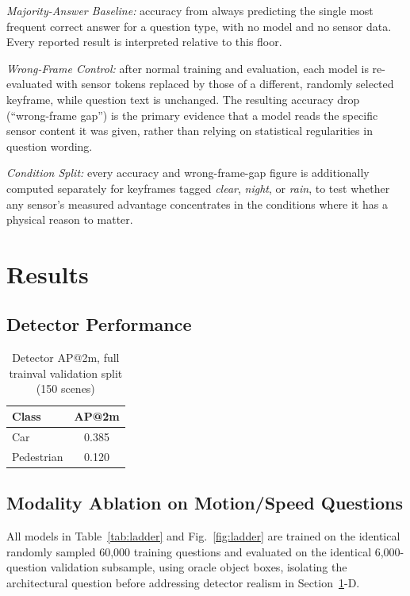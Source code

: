 \documentclass[conference]{IEEEtran}
\begin{document}
\emph{Majority-Answer Baseline:} accuracy from always predicting the single most frequent correct answer for a
question type, with no model and no sensor data. Every reported result is interpreted relative to this floor.

\emph{Wrong-Frame Control:} after normal training and evaluation, each model is re-evaluated with sensor tokens
replaced by those of a different, randomly selected keyframe, while question text is unchanged. The resulting
accuracy drop (``wrong-frame gap'') is the primary evidence that a model reads the specific sensor content it was
given, rather than relying on statistical regularities in question wording.

\emph{Condition Split:} every accuracy and wrong-frame-gap figure is additionally computed separately for
keyframes tagged \emph{clear}, \emph{night}, or \emph{rain}, to test whether any sensor's measured advantage
concentrates in the conditions where it has a physical reason to matter.

\section{Results}
\label{sec:results}

\subsection{Detector Performance}
\begin{table}[htbp]
\centering
\caption{Detector AP@2m, full trainval validation split (150 scenes)}
\label{tab:detap}
\begin{tabular}{lc}
\toprule
Class & AP@2m \\
\midrule
Car & 0.385 \\
Pedestrian & 0.120 \\
\bottomrule
\end{tabular}
\end{table}

\subsection{Modality Ablation on Motion/Speed Questions}
All models in Table~\ref{tab:ladder} and Fig.~\ref{fig:ladder} are trained on the identical randomly sampled
60{,}000 training questions and evaluated on the identical 6{,}000-question validation subsample, using oracle
object boxes, isolating the architectural question before addressing detector realism in Section~\ref{sec:results}-D.
\end{document}
